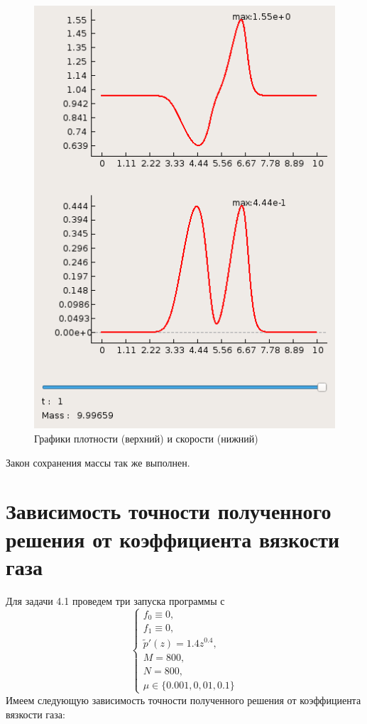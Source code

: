 \documentclass[a4paper, 11pt]{article}
\begin{document}
\begin{figure}[H]
\begin{minipage}[h] {0.49\linewidth}
		\includegraphics[width=1\linewidth]{p2/p2_t=1.png}
	\end{minipage}
	\caption{Графики плотности (верхний) и скорости (нижний)}
\end{figure}


Закон сохранения массы так же выполнен.

\section{Зависимость точности полученного решения от коэффициента вязкости газа}
Для задачи 4.1 проведем три запуска программы с
$$
\begin{cases}
 f_0 \equiv  0, \\
 f_1  \equiv 0, \\
 \tilde{p}'(z) = 1.4z^{0.4}, \\
M = 800, \\
 N = 800, \\
 \mu \in \{0.001, 0,01, 0.1\}
\end{cases}
$$
Имеем следующую зависимость точности полученного решения от коэффициента вязкости газа:
\end{document}
